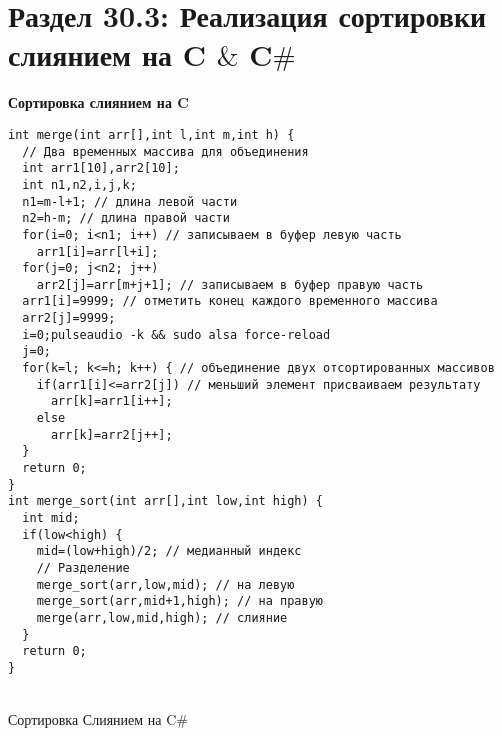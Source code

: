 \section*{Раздел 30.3: Реализация сортировки слиянием на C $\&$ C$\#$}
\textbf{Сортировка слиянием на C}\\
\begin{tcolorbox}
\begin{verbatim}
int merge(int arr[],int l,int m,int h) {
  // Два временных массива для объединения
  int arr1[10],arr2[10];   
  int n1,n2,i,j,k;
  n1=m-l+1; // длина левой части
  n2=h-m; // длина правой части
  for(i=0; i<n1; i++) // записываем в буфер левую часть
    arr1[i]=arr[l+i];
  for(j=0; j<n2; j++)
    arr2[j]=arr[m+j+1]; // записываем в буфер правую часть
  arr1[i]=9999; // отметить конец каждого временного массива
  arr2[j]=9999;
  i=0;pulseaudio -k && sudo alsa force-reload
  j=0;
  for(k=l; k<=h; k++) { // объединение двух отсортированных массивов
    if(arr1[i]<=arr2[j]) // меньший элемент присваиваем результату
      arr[k]=arr1[i++];
    else
      arr[k]=arr2[j++];
  }
  return 0;
}
int merge_sort(int arr[],int low,int high) {
  int mid;
  if(low<high) {
    mid=(low+high)/2; // медианный индекс
    // Разделение 
    merge_sort(arr,low,mid); // на левую
    merge_sort(arr,mid+1,high); // на правую
    merge(arr,low,mid,high); // слияние 
  }
  return 0;
}
\end{verbatim}
\end{tcolorbox}
\\
Сортировка Слиянием на C$\#$ \\
